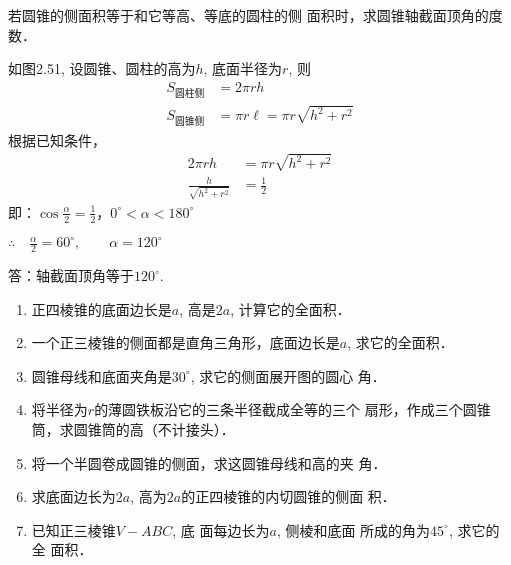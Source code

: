 \begin{example}
    若圆锥的侧面积等于和它等高、等底的圆柱的侧
面积时，求圆锥轴截面顶角的度数．
\end{example}

\begin{figure}[htp]
    \centering
{}
    \caption{}
\end{figure}

\begin{solution}
    如图2.51, 设圆锥、圆柱的高为$h$, 底面半径为$r$, 则
\[\begin{split}
    S_{\text{圆柱侧}}&=2\pi rh\\
S_{\text{圆锥侧}} &=\pi r\ell=\pi r\sqrt{h^2+r^2}
\end{split}\]
根据已知条件，
\[\begin{split}
    2\pi rh&=\pi r\sqrt{h^2+r^2}\\
\frac{h}{\sqrt{h^2+r^2}}&=\frac{1}{2}
\end{split}\]
即：$\cos\frac{\alpha}{2}=\frac{1}{2}$，$0^{\circ}<\alpha<180^{\circ}$

$\therefore\quad \frac{\alpha}{2}=60^{\circ},\qquad \alpha=120^{\circ}$

答：轴截面顶角等于$120^{\circ}$.
\end{solution}

\begin{ex}
\begin{enumerate}
    \item 正四棱锥的底面边长是$a$, 高是$2a$, 计算它的全面积．
    \item 一个正三棱锥的侧面都是直角三角形，底面边长是$a$, 
    求它的全面积．
    \item 圆锥母线和底面夹角是$30^{\circ}$, 求它的侧面展开图的圆心
    角．
    \item 将半径为$r$的薄圆铁板沿它的三条半径截成全等的三个
    扇形，作成三个圆锥筒，求圆锥筒的高（不计接头）．
    \item 
    将一个半圆卷成圆锥的侧面，求这圆锥母线和高的夹
    角．
    \item 求底面边长为$2a$, 高为$2a$的正四棱锥的内切圆锥的侧面
    积．
    \item 已知正三棱锥$V-ABC$, 底
    面每边长为$a$, 侧棱和底面
    所成的角为$45^{\circ}$, 求它的全
    面积．
\end{enumerate}
\end{ex}

